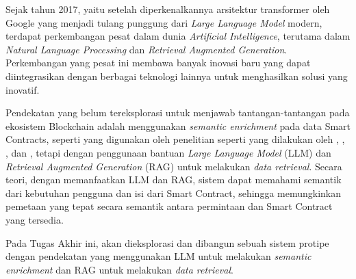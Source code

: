 Sejak tahun 2017, yaitu setelah diperkenalkannya arsitektur transformer oleh Google yang menjadi tulang punggung dari \textit{Large Language Model} modern, terdapat perkembangan pesat dalam dunia \textit{Artificial Intelligence}, terutama dalam \textit{Natural Language Processing} dan \textit{Retrieval Augmented Generation}. Perkembangan yang pesat ini membawa banyak inovasi baru yang dapat diintegrasikan dengan berbagai teknologi lainnya untuk menghasilkan solusi yang inovatif.

Pendekatan yang belum tereksplorasi untuk menjawab tantangan-tantangan pada ekosistem Blockchain adalah menggunakan \textit{semantic enrichment} pada data Smart Contracts, seperti yang digunakan oleh penelitian seperti yang dilakukan oleh \cite{third2017linked}, \cite{shi2021semantic}, \cite{stan}, dan \cite{sopek2018graphchain}, tetapi dengan penggunaan bantuan \textit{Large Language Model} (LLM) dan \textit{Retrieval Augmented Generation} (RAG) untuk melakukan \textit{data retrieval}. Secara teori, dengan memanfaatkan LLM dan RAG, sistem dapat memahami semantik dari kebutuhan pengguna dan isi dari Smart Contract, sehingga memungkinkan pemetaan yang tepat secara semantik antara permintaan dan Smart Contract yang tersedia.


Pada Tugas Akhir ini, akan dieksplorasi dan dibangun sebuah sistem protipe dengan pendekatan yang menggunakan LLM untuk melakukan \textit{semantic enrichment} dan RAG untuk melakukan \textit{data retrieval}.



